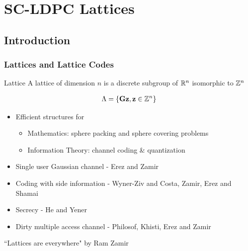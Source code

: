 \documentclass[10pt]{beamer}
\begin{document}
\section{SC-LDPC Lattices}
\subsection{Introduction}
\begin{frame}\frametitle{Lattices and Lattice Codes}
\begin{block}{Lattice}
A lattice of dimension $n$ is a discrete subgroup of $\mathbb{R}^{n}$ isomorphic to $\mathbb{Z}^n$
\end{block}
\vspace{-10pt}
\begin{align*}
\Lambda=\{\mathbf{G}\mathbf{z}, \mathbf{z}\in\mathbb{Z}^{n}\}
\end{align*}
\vspace{-10pt}
\begin{itemize}
	\item Efficient structures for 
	\begin{itemize}
	 		 \item {\blue Mathematics}: sphere packing and sphere covering problems
	   		 \item{\blue Information Theory}: channel coding \& quantization
    \end{itemize}
    \item Single user Gaussian channel - Erez and Zamir
	\item Coding with side information - Wyner-Ziv and Costa, Zamir, Erez and Shamai
	\item Secrecy - He and Yener
	\item Dirty multiple access channel - Philosof, Khisti, Erez and Zamir
\end{itemize}
\vspace{5pt}
	
``Lattices are everywhere" by Ram Zamir
\end{frame}
\end{document}
